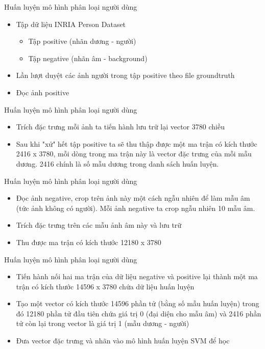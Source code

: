 \documentclass[pdf]{beamer}
\theoremstyle{remark}
\theoremstyle{definition}
\begin{document}
\begin{frame}{Huấn luyện mô hình phân loại người dùng}
	\begin{itemize}
		\item Tập dữ liệu INRIA Person Dataset
		\begin{itemize}
			\item Tập positive (nhãn dương - người)
			\item Tập negative (nhãn âm - background)
		\end{itemize}
		\item Lần lượt duyệt các ảnh người trong tập positive theo file groundtruth
		\item Đọc ảnh positive
	\end{itemize}
\end{frame}

\begin{frame}{Huấn luyện mô hình phân loại người dùng}
	\begin{itemize}
		\item Trích đặc trưng mỗi ảnh ta tiến hành lưu trữ lại vector 3780 chiều
		\item Sau khi "xử" hết tập positive ta sẽ thu thập được một ma trận có kích thước 2416 x 3780, mỗi dòng trong ma trận này là vector đặc trưng của mỗi mẫu dương. 2416 chính là số mẫu dương trong danh sách huấn luyện.
	\end{itemize}
\end{frame}

\begin{frame}{Huấn luyện mô hình phân loại người dùng}
	\begin{itemize}
		\item Đọc ảnh negative, crop trên ảnh này một cách ngẫu nhiên để làm mẫu âm (tức ảnh không có người). Mỗi ảnh negative ta crop ngẫu nhiên 10 mẫu âm.
		\item Trích đặc trưng trên các mẫu ảnh âm này và lưu trữ
		\item Thu được ma trận có kích thước 12180 x 3780
	\end{itemize}
\end{frame}

\begin{frame}{Huấn luyện mô hình phân loại người dùng}
	\begin{itemize}
		\item Tiến hành nối hai ma trận của dữ liệu negative và positive lại thành một ma trận có kích thước 14596 x 3780 chứa dữ liệu huấn luyện
		\item Tạo một vector có kích thước 14596 phần tử (bằng số mẫu huấn luyện) trong đó 12180 phần tử đầu tiên chứa giá trị 0 (đại diện cho mẫu âm) và 2416 phần tử còn lại trong vector là giá trị 1 (mẫu dương - người)
		\item Đưa vector đặc trưng và nhãn vào mô hình huấn luyện SVM để học
	\end{itemize}
\end{frame}
\end{document}

